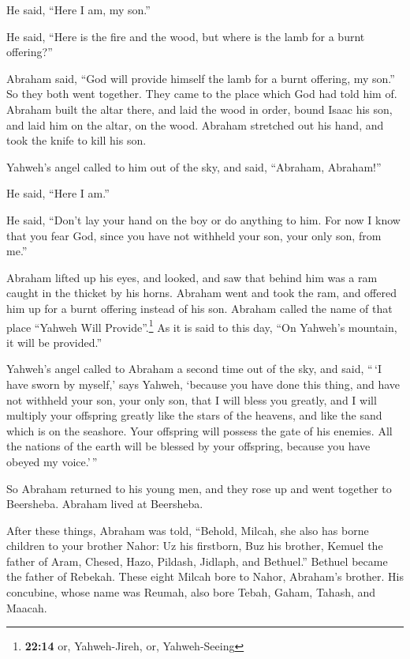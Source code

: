 He said, ``Here I am, my son.''

He said, ``Here is the fire and the wood, but where is the lamb for a
burnt offering?''

 Abraham said, ``God will provide himself the lamb for a
burnt offering, my son.'' So they both went together. 
They came to the place which God had told him of. Abraham built the
altar there, and laid the wood in order, bound Isaac his son, and laid
him on the altar, on the wood.  Abraham stretched out his
hand, and took the knife to kill his son.

 Yahweh's angel called to him out of the sky, and said,
``Abraham, Abraham!''

He said, ``Here I am.''

 He said, ``Don't lay your hand on the boy or do anything
to him. For now I know that you fear God, since you have not withheld
your son, your only son, from me.''

 Abraham lifted up his eyes, and looked, and saw that
behind him was a ram caught in the thicket by his horns. Abraham went
and took the ram, and offered him up for a burnt offering instead of his
son.  Abraham called the name of that place ``Yahweh Will
Provide''.\footnote{\textbf{22:14} or, Yahweh-Jireh, or, Yahweh-Seeing}
As it is said to this day, ``On Yahweh's mountain, it will be
provided.''

 Yahweh's angel called to Abraham a second time out of
the sky,  and said, ``\,`I have sworn by myself,' says
Yahweh, `because you have done this thing, and have not withheld your
son, your only son,  that I will bless you greatly, and I
will multiply your offspring greatly like the stars of the heavens, and
like the sand which is on the seashore. Your offspring will possess the
gate of his enemies.  All the nations of the earth will
be blessed by your offspring, because you have obeyed my voice.'\,''

 So Abraham returned to his young men, and they rose up
and went together to Beersheba. Abraham lived at Beersheba.

 After these things, Abraham was told, ``Behold, Milcah,
she also has borne children to your brother Nahor:  Uz
his firstborn, Buz his brother, Kemuel the father of Aram,
 Chesed, Hazo, Pildash, Jidlaph, and Bethuel.''
 Bethuel became the father of Rebekah. These eight Milcah
bore to Nahor, Abraham's brother.  His concubine, whose
name was Reumah, also bore Tebah, Gaham, Tahash, and Maacah.

